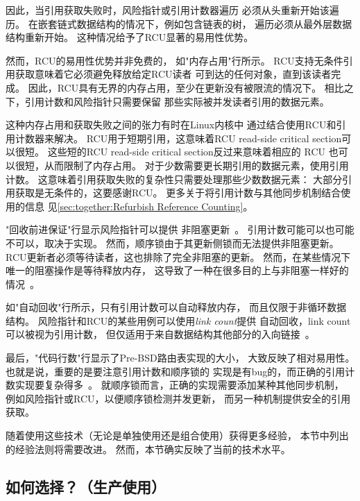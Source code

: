 因此，当引用获取失败时，风险指针或引用计数器遍历
必须从头重新开始该遍历。
在嵌套链式数据结构的情况下，例如包含链表的树，
遍历必须从最外层数据结构重新开始。
这种情况给予了RCU显著的易用性优势。

然而，RCU的易用性优势并非免费的，
如"内存占用"行所示。
RCU支持无条件引用获取意味着它必须避免释放给定RCU读者
可到达的任何对象，直到该读者完成。
因此，RCU具有无界的内存占用，至少在更新没有被限流的情况下。
相比之下，引用计数和风险指针只需要保留
那些实际被并发读者引用的数据元素。

这种内存占用和获取失败之间的张力有时在Linux内核中
通过结合使用RCU和引用计数器来解决。
RCU用于短期引用，这意味着RCU read-side critical section可以很短。
这些短的RCU read-side critical section反过来意味着相应的
RCU 也可以很短，从而限制了内存占用。
对于少数需要更长期引用的数据元素，使用引用计数。
这意味着引用获取失败的复杂性只需要处理那些少数数据元素：
大部分引用获取是无条件的，这要感谢RCU\@。
更多关于将引用计数与其他同步机制结合使用的信息
见\cref{sec:together:Refurbish Reference Counting}。

"回收前进保证"行显示风险指针可以提供
非阻塞更新~\cite{MagedMichael04a,HerlihyLM02}。
引用计数可能可以也可能不可以，取决于实现。
然而，顺序锁由于其更新侧锁而无法提供非阻塞更新。
RCU更新者必须等待读者，这也排除了完全非阻塞的更新。
然而，在某些情况下唯一的阻塞操作是等待释放内存，
这导致了一种在很多目的上与非阻塞一样好的
情况~\cite{MathieuDesnoyers2012URCU}。

如"自动回收"行所示，只有引用计数可以自动释放内存，
而且仅限于非循环数据结构。
风险指针和RCU的某些用例可以使用\emph{link count}提供
自动回收，link count可以被视为引用计数，
但仅适用于来自数据结构其他部分的入向链接~\cite{MagedMichael2018FollyHazptr}。

最后，"代码行数"行显示了Pre-BSD路由表实现的大小，
大致反映了相对易用性。
也就是说，重要的是要注意引用计数和顺序锁的
实现是有bug的，而正确的引用计数实现要复杂得多~\cite{Valois95a,MagedMichael95a}。
就顺序锁而言，正确的实现需要添加某种其他同步机制，
例如风险指针或RCU，以便顺序锁检测并发更新，
而另一种机制提供安全的引用获取。

随着使用这些技术（无论是单独使用还是组合使用）获得更多经验，
本节中列出的经验法则将需要改进。
然而，本节确实反映了当前的技术水平。

\subsection{如何选择？（生产使用）}
\label{sec:defer:Which to Choose? (Production Use)}

